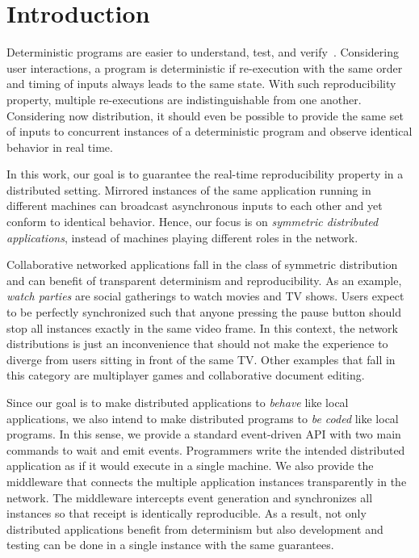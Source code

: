 \documentclass[sigplan,screen]{acmart}
\begin{document}
\section{Introduction}

Deterministic programs are easier to understand, test, and verify~\cite{det}.
Considering user interactions, a program is deterministic if re-execution with
the same order and timing of inputs always leads to the same state.
With such reproducibility property, multiple re-executions are
indistinguishable from one another.
Considering now distribution, it should even be possible to provide the same
set of inputs to concurrent instances of a deterministic program and observe
identical behavior in real time.

In this work, our goal is to guarantee the real-time reproducibility property
in a distributed setting.
Mirrored instances of the same application running in different machines can
broadcast asynchronous inputs to each other and yet conform to
identical behavior.
Hence, our focus is on \emph{symmetric distributed applications}, instead of
machines playing different roles in the network.

Collaborative networked applications fall in the class of symmetric
distribution and can benefit of transparent determinism and reproducibility.
As an example, \emph{watch parties} are social gatherings to watch movies and
TV shows.
Users expect to be perfectly synchronized such that anyone pressing the pause
button should stop all instances exactly in the same video frame.
In this context, the network distributions is just an inconvenience that should
not make the experience to diverge from users sitting in front of the same TV.
Other examples that fall in this category are multiplayer games and
collaborative document editing.

Since our goal is to make distributed applications to \emph{behave} like local
applications, we also intend to make distributed programs to \emph{be coded}
like local programs.
In this sense, we provide a standard event-driven API with two main commands
to wait and emit events.
Programmers write the intended distributed application as if it would execute
in a single machine.
We also provide the middleware that connects the multiple application instances
transparently in the network.
The middleware intercepts event generation and synchronizes all instances so
that receipt is identically reproducible.
As a result, not only distributed applications benefit from determinism but
also development and testing can be done in a single instance with the same
guarantees.
\end{document}
